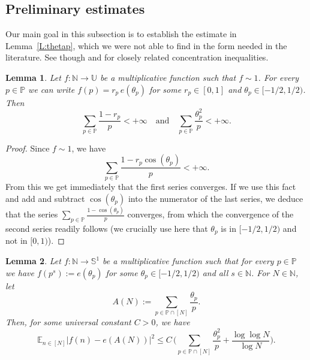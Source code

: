 \documentclass[11pt]{amsart}
\newtheorem{lemma}{Lemma}[section]
\theoremstyle{definition}
\newcommand{\E}{{\mathbb E}}
\newcommand{\N}{{\mathbb N}}
\renewcommand{\P}{{\mathbb P}}
\renewcommand{\S}{\mathbb{S}}
\newcommand{\U}{{\mathbb U}}
\begin{document}
	 	\subsection{Preliminary estimates} Our main goal in this subsection is to establish the estimate in  Lemma~\ref{L:thetap}, which we were not able to find in the form needed in the literature. See though \cite[Proposition~2.3]{Kl17} and \cite[Lemma~2.5]{KMPT21}
for  closely related concentration inequalities. 	
	 	
    \begin{lemma}\label{L:pt1}
	 		Let $f\colon \N\to \U$ be a multiplicative function such that $f\sim 1$.
	 	For every $p\in \P$ we can write $f(p)=r_p \, e(\theta_p)$ for some $r_p\in [0,1]$ and $\theta_p\in [-1/2,1/2)$.
	 Then
	 $$
	 		\sum_{p\in\P} \frac{1-r_p}{p}<+\infty \quad \text{and} \quad \sum_{p\in\P}\frac{\theta_p^2}{p}<+\infty.
	 $$
 	\end{lemma}
	 	\begin{proof}
	 		Since $f\sim 1$, we have
	 		$$
	 		\sum_{p\in\P} \frac{1-r_p\cos(\theta_p)}{p}<+\infty.
	 		$$
	 		From this we get immediately that the first series converges. If we use this fact and add and subtract $\cos(\theta_p)$ into the numerator of the last series, we deduce that the series
	 		$\sum_{p\in\P} \frac{1-\cos(\theta_p)}{p}$ converges, from which the convergence of the second series readily follows (we crucially use here that  $\theta_p$ is in $[-1/2,1/2)$ and not in $[0,1)$).
	 	\end{proof}
	\begin{lemma}\label{L:thetap'}
	Let  $f\colon \N\to \S^1$ be a multiplicative function  such that for every $p\in\P$ we have   $f(p^s):=e(\theta_p)$ for some $\theta_p\in [-1/2,1/2)$ and  all $s\in \N$.  For $N\in \N$, let
	\begin{equation}\label{E:AN}
		A(N):=\sum_{p\in \P\cap [N]}  \frac{\theta_p}{p}.
	\end{equation}
	Then, for some  universal constant $C>0$,  we have
	\begin{equation}\label{E:ANest}
	\E_{n\in [N]}|f(n)-e(A(N))|^2\leq  C \,	\Big(\sum_{p\in \P\cap [N]} \frac{\theta_p^2}{p}+ \frac{\log\log{N}}{\log{N}}\Big).
	\end{equation}
\end{lemma}
\end{document}
